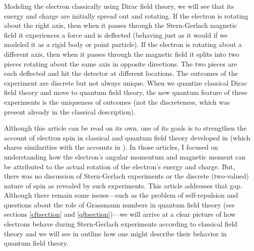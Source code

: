 \documentclass[12pt,secnumarabic,amsmath,amssymb,balancelastpage,nofootinbib]{article}
\begin{document}
Modeling the electron classically using Dirac field theory, we will see that its energy and charge are initially spread out and rotating.  If the electron is rotating about the right axis, then when it passes through the Stern-Gerlach magnetic field it experiences a force and is deflected (behaving just as it would if we modeled it as a rigid body or point particle).  If the electron is rotating about a different axis, then when it passes through the magnetic field it splits into two pieces rotating about the same axis in opposite directions.  The two pieces are each deflected and hit the detector at different locations.  The outcomes of the experiment are discrete but not always unique.  When we quantize classical Dirac field theory and move to quantum field theory, the new quantum feature of these experiments is the uniqueness of outcomes (not the discreteness, which was present already in the classical description).

Although this article can be read on its own, one of its goals is to strengthen the account of electron spin in classical and quantum field theory developed in \citet{howelectronsspin, positrons} (which shares similarities with the accounts in \citealp{ohanian, chuu2010}).  In those articles, I focused on understanding how the electron's angular momentum and magnetic moment can be attributed to the actual rotation of the electron's energy and charge.  But, there was no discussion of Stern-Gerlach experiments or the discrete (two-valued) nature of spin as revealed by such experiments.  This article addresses that gap.  Although there remain some issues---such as the problem of self-repulsion and questions about the role of Grassmann numbers in quantum field theory (see sections \ref{cftsection} and \ref{qftsection})---we will arrive at a clear picture of how electrons behave during Stern-Gerlach experiments according to classical field theory and we will see in outline how one might describe their behavior in quantum field theory.
\end{document}
